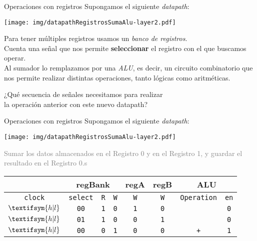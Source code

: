\documentclass[aspectratio=169]{beamer}
\begin{document}
\begin{frame}[fragile,t]{Operaciones con registros}
    \footnotesize Supongamos el siguiente \emph{datapath}:
    \vspace{-0.05cm}
    \begin{center}
    \texttt{[image: img/datapathRegistrosSumaAlu-layer2.pdf]}
    \end{center}
    \pause
    \small
    Para tener múltiples registros usamos un \emph{banco de registros}.\\ 
    Cuenta una señal que nos permite \textbf{seleccionar} el registro con el que buscamos operar.\\
    \bigskip
    Al sumador lo remplazamos por una \emph{ALU}, es decir, un circuito combinatorio que nos permite realizar distintas operaciones, tanto lógicas como aritméticas.\\
    \pause
    \begin{center}
    \normalsize \textcolor{naranjauca}{¿Qué secuencia de señales necesitamos para realizar\\ la operación anterior con este nuevo datapath?}
    \vspace{-1cm}
    \end{center}
\end{frame}

\begin{frame}[fragile,t]{Operaciones con registros}
    \footnotesize Supongamos el siguiente \emph{datapath}:
    \vspace{-0.05cm}
    \begin{center}
    \texttt{[image: img/datapathRegistrosSumaAlu-layer2.pdf]}
    \end{center}
    \textcolor{gray}{\small {Sumar los datos almacenados en el Registro 0 y en el Registro 1, y guardar el resultado en el Registro 0.s}}\\
    \begin{center} \footnotesize
    \begin{tabular}{|c|c|c|c|c|c|c|c|} \hline
                                & \multicolumn{3}{c|}{regBank} & \multicolumn{1}{c|}{regA} & \multicolumn{1}{c|}{regB} & \multicolumn{2}{c|}{ALU}\\ \hline
     \texttt{clock}             & \texttt{select} & \texttt{R} & \texttt{W} & \texttt{W} & \texttt{W} & \texttt{Operation} & \texttt{en} \\ \hline \noalign{\pause}
     {\tiny $\textifsym{h|l}$}  & \texttt{00}     & \texttt{1} & \texttt{0} & \texttt{1} & \texttt{0} & \texttt{}          & \texttt{0} \\ \hline \noalign{\pause}
     {\tiny $\textifsym{h|l}$}  & \texttt{01}     & \texttt{1} & \texttt{0} & \texttt{0} & \texttt{1} & \texttt{}          & \texttt{0} \\ \hline \noalign{\pause}
     {\tiny $\textifsym{h|l}$}  & \texttt{00}     & \texttt{0} & \texttt{1} & \texttt{0} & \texttt{0} & \texttt{+}         & \texttt{1} \\ \hline
    \end{tabular}
    \end{center}
\end{frame}
\end{document}
